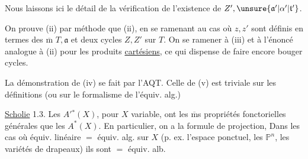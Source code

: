 
Nous laissons ici le détail de la vérification de l'existence de $Z',\unsure{\mathfrak a'|\alpha'|\mathfrak{t}'}$.

On prouve (ii) par  méthode que (ii),  en se ramenant au cas où $z,z'$ sont définis en termes des $\overline{\mathrm m}$ $T,\mathfrak a$ et deux cycles $Z,Z'$ sur $T$. On  se ramener  à (iii) et à l'énoncé analogue à (ii) pour les produits \uline{cartésiens}, ce qui dispense de faire encore bouger  cycles.

La démonstration de (iv) se fait par l'AQT. Celle de (v) est triviale sur les définitions (ou sur le formalisme de l'équiv. alg.)

 \uline{Scholie} 1.3. Les $A'{}^*(X)$, pour $X$ variable, ont les $\overline{\mathrm m}$s propriétés fonctorielles générales que les $A^*(X)$. En particulier, on a la formule de projection, Dans les cas où équiv. linéaire $=$ équiv. alg. sur $X$ (p. ex. l'espace ponctuel, les $\mathbb P^n$, les variétés de drapeaux) ils sont $=$ équiv. alb.

